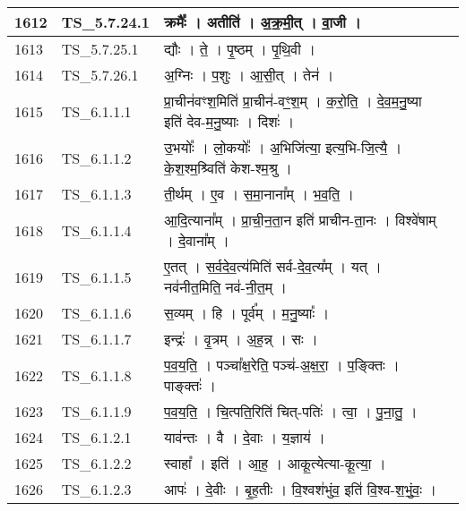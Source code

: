 \documentclass[17pt]{extarticle}
\begin{document}
\begin{longtable}{||p{0.4in}||p{0.9in}||p{4.0in}||p{0.9in}||}
        \hline
            1612 & TS\_5.7.24.1 & क्रमैः᳚   ।   अतीति॑   ।   अ॒क्र॒मी॒त्   ।   वा॒जी   ।    &      \\
        \hline
            1613 & TS\_5.7.25.1 & द्यौः   ।   ते॒   ।   पृ॒ष्ठम्   ।   पृ॒थि॒वी   ।    &      \\
        \hline
            1614 & TS\_5.7.26.1 & अ॒ग्निः   ।   प॒शुः   ।   आ॒सी॒त्   ।   तेन॑   ।    &      \\
        \hline
            1615 & TS\_6.1.1.1 & प्रा॒चीन॑वꣳश॒मिति॑ प्रा॒चीन॑{-}वꣳ॒॒श॒म्   ।   क॒रो॒ति॒   ।   दे॒व॒म॒नु॒ष्या इति॑ देव{-}म॒नु॒ष्याः   ।   दिशः॑   ।    &      \\
        \hline
            1616 & TS\_6.1.1.2 & उ॒भयोः᳚   ।   लो॒कयोः᳚   ।   अ॒भिजि॑त्या॒ इत्य॒भि{-}जि॒त्यै॒   ।   के॒श॒श्म॒श्र्विति॑ केश{-}श्म॒श्रु   ।    &      \\
        \hline
            1617 & TS\_6.1.1.3 & ती॒र्थम्   ।   ए॒व   ।   स॒मा॒नाना᳚म्   ।   भ॒व॒ति॒   ।    &      \\
        \hline
            1618 & TS\_6.1.1.4 & आ॒दि॒त्याना᳚म्   ।   प्रा॒ची॒न॒ता॒न इति॑ प्राचीन{-}ता॒नः   ।   विश्वे॑षाम्   ।   दे॒वाना᳚म्   ।    &      \\
        \hline
            1619 & TS\_6.1.1.5 & ए॒तत्   ।   स॒र्व॒दे॒व॒त्य॑मिति॑ सर्व{-}दे॒व॒त्य᳚म्   ।   यत्   ।   नव॑नीत॒मिति॒ नव॑{-}नी॒त॒म्   ।    &      \\
        \hline
            1620 & TS\_6.1.1.6 & स॒व्यम्   ।   हि   ।   पूर्व᳚म्   ।   म॒नु॒ष्याः᳚   ।    &      \\
        \hline
            1621 & TS\_6.1.1.7 & इन्द्रः॑   ।   वृ॒त्रम्   ।   अ॒ह॒न्न्   ।   सः   ।    &      \\
        \hline
            1622 & TS\_6.1.1.8 & प॒व॒य॒ति॒   ।   पञ्चा᳚क्ष॒रेति॒ पञ्च॑{-}अ॒क्ष॒रा॒   ।   प॒ङ्क्तिः   ।   पाङ्क्तः॑   ।    &      \\
        \hline
            1623 & TS\_6.1.1.9 & प॒व॒य॒ति॒   ।   चि॒त्पति॒रिति॑ चित्{-}पतिः॑   ।   त्वा॒   ।   पु॒ना॒तु॒   ।    &      \\
        \hline
            1624 & TS\_6.1.2.1 & याव॑न्तः   ।   वै   ।   दे॒वाः   ।   य॒ज्ञाय॑   ।    &      \\
        \hline
            1625 & TS\_6.1.2.2 & स्वाहा᳚   ।   इति॑   ।   आ॒ह॒   ।   आकू॒त्येत्या{-}कू॒त्या॒   ।    &      \\
        \hline
            1626 & TS\_6.1.2.3 & आपः॑   ।   दे॒वीः   ।   बृ॒ह॒तीः   ।   वि॒श्वश॑भुंव॒ इति॑ वि॒श्व{-}श॒भुं॒वः॒   ।    &      \\

\end{longtable}
\end{document}
